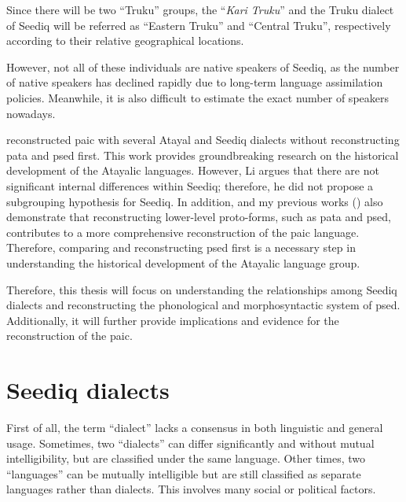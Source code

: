 Since there will be two ``Truku'' groups, the ``\textit{Kari Truku}'' and the Truku dialect of Seediq will be referred as ``Eastern Truku'' and ``Central Truku'', respectively according to their relative geographical locations.

 However, not all of these individuals are native speakers of Seediq, as the number of native speakers has declined rapidly due to long-term language assimilation policies. Meanwhile, it is also difficult to estimate the exact number of speakers nowadays.

\textcite{li1981paic} reconstructed \ac{paic} with several Atayal and Seediq dialects without reconstructing \ac{pata} and \ac{psed} first. This work provides groundbreaking research on the historical development of the Atayalic languages. However, Li argues that there are not significant internal differences within Seediq; therefore, he did not propose a subgrouping hypothesis for Seediq. In addition, \textcite{goderich2020phd} and my previous works (\cite{song2022Aicd,song2023Aicgprime}) also demonstrate that reconstructing lower-level proto-forms, such as \acl{pata} and \acl{psed}, contributes to a more comprehensive reconstruction of the \acl{paic} language. Therefore, comparing and reconstructing \acl{psed} first is a necessary step in understanding the historical development of the Atayalic language group.

Therefore, this thesis will focus on understanding the relationships among Seediq dialects and reconstructing the phonological and morphosyntactic system of \acl{psed}. Additionally, it will further provide implications and evidence for the reconstruction of the \acl{paic}.


\section{Seediq dialects}

First of all, the term ``dialect'' lacks a consensus in both linguistic and general usage. Sometimes, two ``dialects'' can differ significantly and without mutual intelligibility, but are classified under the same language. Other times, two ``languages'' can be mutually intelligible but are still classified as separate languages rather than dialects. This involves many social or political factors. 

